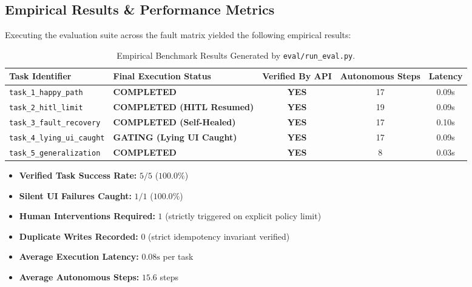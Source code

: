 \subsection{Empirical Results \& Performance Metrics}
Executing the evaluation suite across the fault matrix yielded the following empirical results:

\begin{table}[htbp]
  \centering
  \small
  \begin{tabularx}{\textwidth}{l X c c c}
    \toprule
    \textbf{Task Identifier} & \textbf{Final Execution Status} & \textbf{Verified By API} & \textbf{Autonomous Steps} & \textbf{Latency} \\
    \midrule
    \texttt{task\_1\_happy\_path} & \textbf{COMPLETED} & \textcolor{centragreen}{\textbf{YES}} & 17 & 0.09s \\
    \texttt{task\_2\_hitl\_limit} & \textbf{COMPLETED (HITL Resumed)} & \textcolor{centragreen}{\textbf{YES}} & 19 & 0.09s \\
    \texttt{task\_3\_fault\_recovery} & \textbf{COMPLETED (Self-Healed)} & \textcolor{centragreen}{\textbf{YES}} & 17 & 0.10s \\
    \texttt{task\_4\_lying\_ui\_caught} & \textbf{GATING (Lying UI Caught)} & \textcolor{centragreen}{\textbf{YES}} & 17 & 0.09s \\
    \texttt{task\_5\_generalization} & \textbf{COMPLETED} & \textcolor{centragreen}{\textbf{YES}} & 8 & 0.03s \\
    \bottomrule
  \end{tabularx}
  \caption{Empirical Benchmark Results Generated by \texttt{eval/run\_eval.py}.}
  \label{tab:benchmark_results}
\end{table}

\begin{insightbox}
\begin{itemize}
  \item \textbf{Verified Task Success Rate:} $5/5$ ($100.0\%$)
  \item \textbf{Silent UI Failures Caught:} $1/1$ ($100.0\%$)
  \item \textbf{Human Interventions Required:} $1$ (strictly triggered on explicit policy limit)
  \item \textbf{Duplicate Writes Recorded:} $0$ (strict idempotency invariant verified)
  \item \textbf{Average Execution Latency:} $0.08\text{s}$ per task
  \item \textbf{Average Autonomous Steps:} $15.6$ steps
\end{itemize}
\end{insightbox}

